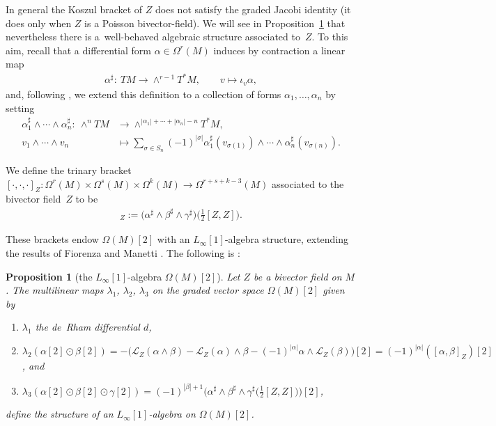 \documentclass[pdftex]{sigma}
\numberwithin{equation}{section}
\newtheorem{Proposition}[Theorem]{Proposition}
 { \theoremstyle{definition}
\newtheorem{Definition}[Theorem]{Definition}
\newtheorem{Remark}[Theorem]{Remark} }
\newcommand{\Lie}{\mathcal{L}}
\begin{document}
In general the Koszul bracket of $Z$ does not satisfy the graded Jacobi identity (it does only when $Z$ is a Poisson bivector-field). We will see in Proposition~\ref{proposition: extended Koszul} that nevertheless there is a~well-behaved algebraic structure associated to~$Z$. To this aim, recall that a differential form $\alpha \in \Omega^r(M)$ induces by contraction a linear map
\begin{gather*}\alpha^\sharp\colon \ TM \to \wedge^{r-1}T^*M, \qquad v \mapsto \iota_v\alpha,\end{gather*}
and, following \cite[Section~2.3]{FZgeo}, we extend this definition to a collection of forms $\alpha_1,\dots,\alpha_n$ by setting
\begin{align*}
 \alpha_1^\sharp \wedge \cdots \wedge \alpha_n^\sharp\colon \ \wedge^n TM &\to \wedge^{|\alpha_1|+\cdots +|\alpha_n|-n}T^*M, \\
 v_1\wedge \cdots \wedge v_n & \mapsto \sum_{\sigma \in S_n}(-1)^{|\sigma|}\alpha_1^\sharp(v_{\sigma(1)})\wedge \cdots \wedge \alpha_n^\sharp(v_{\sigma(n)}).
\end{align*}

\begin{Definition}\label{definition: trinary bracket}We define the trinary bracket $[\cdot,\cdot,\cdot]_Z\colon \Omega^r(M)\times \Omega^s(M)\times \Omega^k(M)\!\to\! \Omega^{r+s+k-3}(M)$ associated to the bivector field~$Z$
to be
\begin{gather*}[\alpha,\beta,\gamma]_Z:= \big(\alpha^\sharp \wedge \beta^\sharp \wedge \gamma^\sharp\big)\big(\tfrac{1}{2}[Z,Z]\big).\end{gather*}
\end{Definition}

These brackets endow $\Omega(M)[2]$ with an $L_\infty[1]$-algebra structure, extending the results of Fiorenza and Manetti \cite{Fiorenza--ManettiForm}. The following is \cite[Proposition~3.5]{SZPre}:
\begin{Proposition}[the {$L_\infty[1]$}-algebra {$\Omega(M)[2]$}] \label{proposition: extended Koszul} Let $Z$ be a bivector field on $M$. The multilinear maps $\lambda_1$, $\lambda_2$, $\lambda_3$ on the graded vector space $\Omega(M)[2]$ given by
\begin{enumerate}\itemsep=0pt
\item[$1)$] $\lambda_1$ the de~Rham differential $d$,
\item[$2)$] $\lambda_2(\alpha[2] \odot \beta[2])=-\big(\Lie_Z(\alpha\wedge \beta) - \Lie_Z(\alpha)\wedge \beta - (-1)^{\vert \alpha \vert}\alpha \wedge \Lie_Z(\beta)\big)[2] = (-1)^{|\alpha|} ([\alpha,\beta]_Z)[2]$, and
\item[$3)$] $\lambda_3(\alpha[2]\odot \beta[2]\odot \gamma[2])=(-1)^{|\beta|+1}\big(\alpha^\sharp\wedge \beta^\sharp \wedge \gamma^\sharp\big(\frac{1}{2}[Z,Z]\big)\big)[2]$,
\end{enumerate}
define the structure of an $L_\infty[1]$-algebra on $\Omega(M)[2]$.
\end{Proposition}
\end{document}

